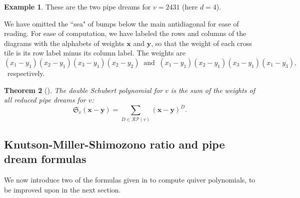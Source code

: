 \documentclass[reqno]{amsart}
\def\plaqname{plaq}%
\newcommand\plaq[2][]{
\node[bgplaq,rectangle,draw,minimum size=\loopcellsize,transform shape] (\plaqname) {};
\useasboundingbox;
\pgfkeys{/linkpattern/.cd,#1}%
\ifx#2\empty\else
\begin{scope}[x=\loopcellsize,y=\loopcellsize]
\csname plaq#2\endcsname
\end{scope}\fi
}
\numberwithin{equation}{section}
\newtheorem{theorem}{Theorem}[section]
\theoremstyle{definition}
\newtheorem{example}[theorem]{Example}
\theoremstyle{remark}
\begin{document}
\begin{example}
These are the two pipe dreams for $v=2431$ (here $d=4$).
\begin{center}
\hspace{1cm}
\end{center}
We have omitted the ``sea" of bumps below the main antidiagonal for ease of reading. For ease of computation, we have labeled the rows and columns of the diagrams with the alphabets of weights $\mathbf{x}$ and $\mathbf{y}$, so that the weight of each cross tile is its row label minus its column label. The weights are 
\[(x_1-y_1)(x_2-y_1)(x_3-y_1)(x_2-y_2)~\text{ and }~(x_1-y_1)(x_2-y_1)(x_3-y_1)(x_1-y_3),\]\
respectively.
\end{example}
\begin{theorem}[\cite{fk96}]\label{thm:pdschubert}
The double Schubert polynomial for $v$ is the sum of the weights of all reduced pipe dreams for $v$:
\[\mathfrak{S}_v(\mathbf{x}-\mathbf{y})=\sum_{D \in \mathcal{RP}(v)}(\mathbf{x}-\mathbf{y})^D.\]
\end{theorem}

\subsection{Knutson-Miller-Shimozono ratio and pipe dream formulas}\label{subsec:oldformulas}
We now introduce two of the formulas given in \cite{kms06} to compute quiver polynomials, to be improved upon in the next section.
\end{document}
